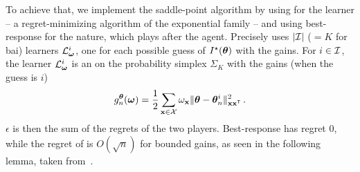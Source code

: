 
To achieve that, we implement the saddle-point algorithm by using \AH for the learner -- a regret-minimizing algorithm of the exponential family -- and using best-response for the nature, which plays after the agent. Precisely \LG{} uses $|\mathcal{I}|$ ($=K$ for \gls{bai}) learners $\mathcal{L}_{\boldsymbol \omega}^i$, one for each possible guess of $I^\star({\boldsymbol \theta})$ with the gains. For $i\in\mathcal{I}$, the learner $\mathcal{L}_{\boldsymbol \omega}^i$ is an \AH on the probability simplex $\Sigma_K$ with the gains (when the guess is $i$)
\[
    g_n^{\boldsymbol \theta}({\boldsymbol \omega}) = \frac{1}{2} \sum_{{\bf x}\in\mathcal{X}}  \omega_{{\bf x}} \Vert {\boldsymbol \theta} - {\boldsymbol \theta}_n^i \Vert^2_{{\bf x} {\bf x}^\mathsf{\scriptscriptstyle T}}\,.
\]
$\epsilon$ is then the sum of the regrets of the two players. Best-response has regret 0, while the regret of \AH is $O(\sqrt{n})$ for bounded gains, as seen in the following lemma, taken from~\citet{derooij2014hedge}.

